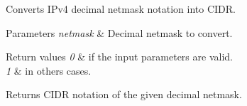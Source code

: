 Converts I\+Pv4 decimal netmask notation into C\+I\+DR. 


\begin{DoxyParams}{Parameters}
{\em netmask} & Decimal netmask to convert. \\
\hline
\end{DoxyParams}

\begin{DoxyRetVals}{Return values}
{\em 0} & if the input parameters are valid. \\
\hline
{\em 1} & in others cases. \\
\hline
\end{DoxyRetVals}
\begin{DoxyReturn}{Returns}
C\+I\+DR notation of the given decimal netmask. 
\end{DoxyReturn}
